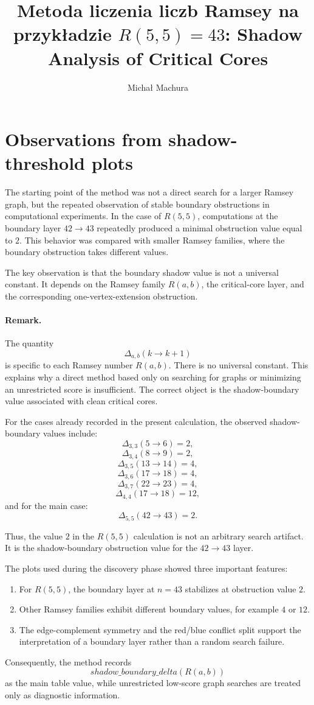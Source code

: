 ﻿\documentclass[11pt]{article}
\title{Metoda liczenia liczb Ramsey na przykładzie \(R(5,5)=43\): Shadow Analysis of Critical Cores}
\author{Michał Machura}
\date{}
\begin{document}
\maketitle


\section{Observations from shadow-threshold plots}

The starting point of the method was not a direct search for a larger Ramsey graph, but the repeated observation of stable boundary obstructions in computational experiments. In the case of \(R(5,5)\), computations at the boundary layer \(42 \to 43\) repeatedly produced a minimal obstruction value equal to \(2\). This behavior was compared with smaller Ramsey families, where the boundary obstruction takes different values.

The key observation is that the boundary shadow value is not a universal constant. It depends on the Ramsey family \(R(a,b)\), the critical-core layer, and the corresponding one-vertex-extension obstruction.

\paragraph{Remark.}
The quantity
\[
\Delta_{a,b}(k \to k+1)
\]
is specific to each Ramsey number \(R(a,b)\). There is no universal constant. This explains why a direct method based only on searching for graphs or minimizing an unrestricted score is insufficient. The correct object is the shadow-boundary value associated with clean critical cores.

For the cases already recorded in the present calculation, the observed shadow-boundary values include:
\[
\Delta_{3,3}(5 \to 6)=2,
\]
\[
\Delta_{3,4}(8 \to 9)=2,
\]
\[
\Delta_{3,5}(13 \to 14)=4,
\]
\[
\Delta_{3,6}(17 \to 18)=4,
\]
\[
\Delta_{3,7}(22 \to 23)=4,
\]
\[
\Delta_{4,4}(17 \to 18)=12,
\]
and for the main case:
\[
\Delta_{5,5}(42 \to 43)=2.
\]

Thus, the value \(2\) in the \(R(5,5)\) calculation is not an arbitrary search artifact. It is the shadow-boundary obstruction value for the \(42 \to 43\) layer.

The plots used during the discovery phase showed three important features:

\begin{enumerate}
    \item For \(R(5,5)\), the boundary layer at \(n=43\) stabilizes at obstruction value \(2\).
    \item Other Ramsey families exhibit different boundary values, for example \(4\) or \(12\).
    \item The edge-complement symmetry and the red/blue conflict split support the interpretation of a boundary layer rather than a random search failure.
\end{enumerate}

Consequently, the method records
\[
shadow\_boundary\_delta(R(a,b))
\]
as the main table value, while unrestricted low-score graph searches are treated only as diagnostic information.
\end{document}
